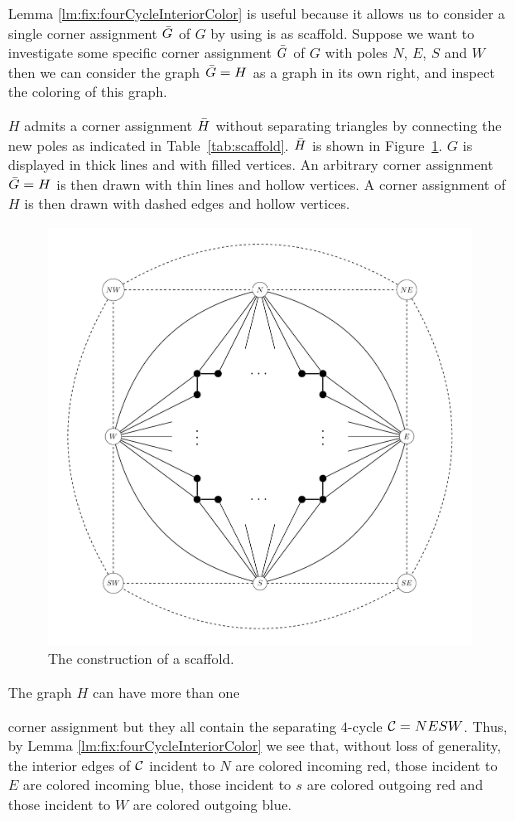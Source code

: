   Lemma \ref{lm:fix:fourCycleInteriorColor} is useful because it allows us to consider a single corner assignment $\bar{G}$ of $G$ by using is as scaffold. Suppose we want to investigate some specific corner assignment $\bar{G}$ of $G$ with poles $N$, $E$, $S$ and $W$ then we can consider the graph $\bar{G} = H$ as a graph in its own right, and inspect the coloring of this graph.

  \noindent
  $H$ admits a corner assignment $\bar{H}$ without separating triangles by connecting the new poles as indicated in Table~\ref{tab:scaffold}.
  $\bar{H}$ is shown in Figure~\ref{fig:scafold}.
  $G$ is displayed in thick lines and with filled vertices.
  An arbitrary corner assignment $\bar{G} =H$ is then drawn with thin lines and hollow vertices.
  A corner assignment of $H$ is then drawn with dashed edges and hollow vertices.

  \begin{figure}
    \centering
    \includegraphics[scale=0.4]{fixExtension/img/scafold}
    \caption{The construction of a scaffold.
    \label{fig:scafold}}
  \end{figure}

  The graph $H$ can have more than one

  \noindent %
  corner assignment but they all contain the separating $4$-cycle $\mathcal{C}= NESW$. Thus, by Lemma \ref{lm:fix:fourCycleInteriorColor} we see that, without loss of generality, the interior edges of $\mathcal{C}$ incident to $N$ are colored incoming red, those incident to $E$ are colored incoming blue, those incident to $s$ are colored outgoing red and those incident to $W$ are colored outgoing blue.

